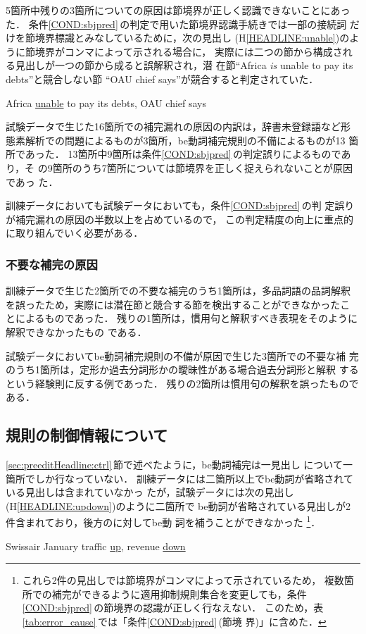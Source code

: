 5箇所中残りの3箇所についての原因は節境界が正しく認識できないことにあっ
た．
条件\ref{COND:sbjpred}\,の判定で用いた節境界認識手続きでは一部の接続詞
だけを節境界標識とみなしているために，次の見出し
(H\ref{HEADLINE:unable})のように節境界がコンマによって示される場合に，
実際には二つの節から構成される見出しが一つの節から成ると誤解釈され，潜
在節``Africa {\it is} unable to pay its debts''と競合しない節
``OAU chief says''が競合すると判定されていた．
\begin{HEADLINE}
\headline Africa \underline{unable} to pay its debts, OAU chief says
\label{HEADLINE:unable}
\end{HEADLINE}

試験データで生じた16箇所での補完漏れの原因の内訳は，辞書未登録語など形
態素解析での問題によるものが3箇所，be動詞補完規則の不備によるものが13
箇所であった．
13箇所中9箇所は条件\ref{COND:sbjpred}\,の判定誤りによるものであり，そ
の9箇所のうち7箇所については節境界を正しく捉えられないことが原因であっ
た．

訓練データにおいても試験データにおいても，条件\ref{COND:sbjpred}\,の判
定誤りが補完漏れの原因の半数以上を占めているので，
この判定精度の向上に重点的に取り組んでいく必要がある．

\subsubsection{不要な補完の原因}

訓練データで生じた2箇所での不要な補完のうち1箇所は，多品詞語の品詞解釈
を誤ったため，実際には潜在節と競合する節を検出することができなかったこ
とによるものであった．
残りの1箇所は，慣用句と解釈すべき表現をそのように解釈できなかったもの
である．

試験データにおいてbe動詞補完規則の不備が原因で生じた3箇所での不要な補
完のうち1箇所は，定形か過去分詞形かの曖昧性がある場合過去分詞形と解釈
するという経験則に反する例であった．
残りの2箇所は慣用句の解釈を誤ったものである．

\subsection{規則の制御情報について}

\ref{sec:preeditHeadline:ctrl}\,節で述べたように，be動詞補完は一見出し
について一箇所でしか行なっていない．
訓練データには二箇所以上でbe動詞が省略されている見出しは含まれていなかっ
たが，試験データには次の見出し(H\ref{HEADLINE:updown})のように二箇所で
be動詞が省略されている見出しが2件含まれており，後方の\KEY に対してbe動
詞を補うことができなかった
\footnote{
これら2件の見出しでは節境界がコンマによって示されているため，
複数箇所での補完ができるように適用抑制規則集合を変更しても，条件
\ref{COND:sbjpred}\,の節境界の認識が正しく行なえない．
このため，表\ref{tab:error_cause}\,では「条件\ref{COND:sbjpred}\,(節境
界)」に含めた．}．
\begin{HEADLINE}
\headline Swissair January traffic \underline{up}, revenue
\underline{down}
\label{HEADLINE:updown}
\end{HEADLINE}

